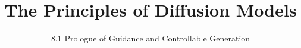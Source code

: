 ﻿%

\graphicspath{{../images/}}
\title{The Principles of Diffusion Models}
\subtitle{8.1 Prologue of Guidance and Controllable Generation}


\begin{frame}
    \titlepage
\end{frame}



